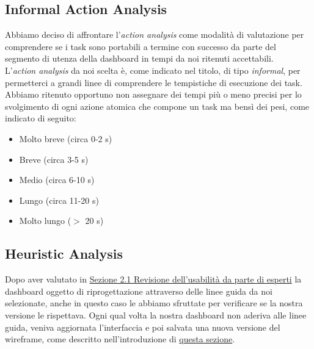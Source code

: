 \subsection{Informal Action Analysis}
\label{ss:informal-action-analysis}
Abbiamo deciso di affrontare l'\textit{action analysis} come modalità di valutazione per comprendere se i task sono portabili a termine con successo da parte del segmento di utenza della dashboard in tempi da noi ritenuti accettabili.\\
L'\textit{action analysis} da noi scelta è, come indicato nel titolo, di tipo \textit{informal}, per permetterci a grandi linee di comprendere le tempistiche di esecuzione dei task.\\
Abbiamo ritenuto opportuno non assegnare dei tempi più o meno precisi per lo svolgimento di ogni azione atomica che compone un task ma bensì dei pesi, come indicato di seguito:
\begin{itemize}
    \item Molto breve (circa 0-2 s)
    \item Breve (circa 3-5 s) 
    \item Medio (circa 6-10 s) 
    \item Lungo (circa 11-20 s) 
    \item Molto lungo ($>$ 20 s)
\end{itemize}








\subsection{Heuristic Analysis}
\label{ss:heuristic-analysis}
Dopo aver valutato in \hyperref[s:revisione-usabilita-esperti]{Sezione 2.1 Revisione dell'usabilità da parte di esperti} la dashboard oggetto di riprogettazione attraverso delle linee guida da noi selezionate, anche in questo caso le abbiamo sfruttate per verificare se la nostra versione le rispettava.
Ogni qual volta la nostra dashboard non aderiva alle linee guida, veniva aggiornata l'interfaccia e poi salvata una nuova versione del wireframe, come descritto nell'introduzione di \hyperref[s:inspection]{questa sezione}.
